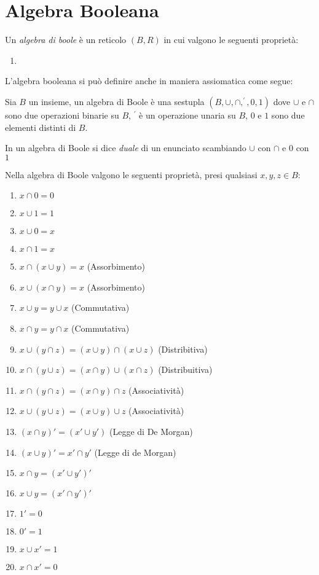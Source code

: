 \section{Algebra Booleana}
Un \emph{algebra di boole} è un reticolo $(B,R)$ in cui valgono le seguenti proprietà:
\begin{enumerate}
    \item
\end{enumerate}

L'algebra booleana si può definire anche in maniera assiomatica come segue:
\begin{defi}
    Sia $B$ un insieme, un algebra di Boole è una sestupla $(B,\cup,\cap,^{'},0,1)$
dove $\cup$ e $\cap$ sono due operazioni binarie su $B$, $^{'}$ è un operazione unaria su $B$,
$0$ e $1$ sono due elementi distinti di $B$.
\end{defi}

\begin{defi}
    In un algebra di Boole si dice \emph{duale} di un enunciato scambiando $\cup$
    con $\cap$ e $0$ con $1$
\end{defi}

\begin{thm}Nella algebra di Boole valgono le seguenti proprietà, presi qualsiasi $x,y,z \in B$:
\end{thm}
\begin{enumerate}
    \item $x \cap 0 = 0$
    \item $x \cup 1 = 1$
    \item $x \cup 0 = x$
    \item $x \cap 1 = x $
    \item $x \cap (x \cup y) = x$ (Assorbimento)
    \item $x \cup (x \cap y) = x$ (Assorbimento)
    \item $x \cup y = y \cup x $ (Commutativa)
    \item $x \cap y = y \cap x $ (Commutativa)
    \item $x \cup (y \cap z) = (x \cup y) \cap (x \cup z) $ (Distribitiva)
    \item $x \cap (y \cup z) = (x \cap y) \cup (x \cap z) $ (Distribuitiva)
    \item $x \cap (y \cap z) = (x \cap y) \cap z$ (Associatività)
    \item $x \cup (y \cup z) = (x \cup y) \cup z$ (Associatività)
    \item $(x \cap y)' = (x' \cup y')$ (Legge di De Morgan)
    \item $(x \cup y)' = x' \cap y' $ (Legge di de Morgan)
    \item $x \cap y = (x' \cup y')'$
    \item $x \cup y = (x' \cap y')'$
    \item $1' = 0$
    \item $0' = 1$
    \item $x \cup x' = 1$
    \item $x \cap x' = 0$
\end{enumerate}

